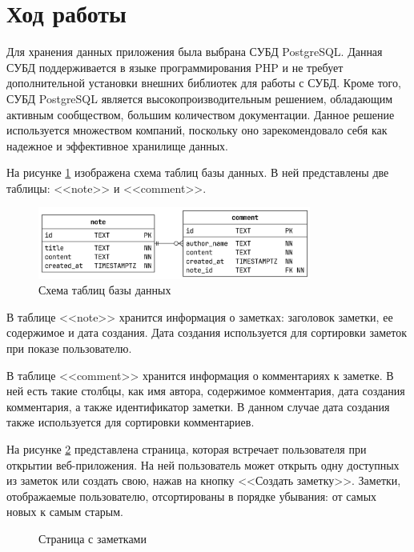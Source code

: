 \documentclass[a4paper, 14pt]{extarticle}
\begin{document}
\section{Ход работы}

Для хранения данных приложения была выбрана СУБД PostgreSQL. Данная СУБД
поддерживается в языке программирования PHP и не требует дополнительной
установки внешних библиотек для работы с СУБД. Кроме того, СУБД PostgreSQL
является высокопроизводительным решением, обладающим активным сообществом,
большим количеством документации. Данное решение используется множеством
компаний, поскольку оно зарекомендовало себя как надежное и эффективное
хранилище данных.

На рисунке \ref{fig:puml/database.png} изображена схема таблиц базы данных. В
ней представлены две таблицы: <<note>> и <<comment>>.

\begin{figure}[H]
  \centering
  \includegraphics[width=0.8\textwidth]{images/puml/database.png}
  \caption{Схема таблиц базы данных}
  \label{fig:puml/database.png}
\end{figure}

В таблице <<note>> хранится информация о заметках: заголовок заметки, ее
содержимое и дата создания. Дата создания используется для сортировки заметок
при показе пользователю.

В таблице <<comment>> хранится информация о комментариях к заметке. В ней есть
такие столбцы, как имя автора, содержимое комментария, дата создания
комментария, а также идентификатор заметки. В данном  случае дата создания также
используется для сортировки комментариев.

На рисунке \ref{fig:notes.png} представлена страница, которая встречает
пользователя при открытии веб-приложения. На ней пользователь может открыть одну
доступных из заметок или создать свою, нажав на кнопку <<Создать заметку>>.
Заметки, отображаемые пользователю, отсортированы в порядке убывания: от самых
новых к самым старым.

\begin{figure}[H]
  \centering
  \caption{Страница с заметками}
  \label{fig:notes.png}
\end{figure}
\end{document}
